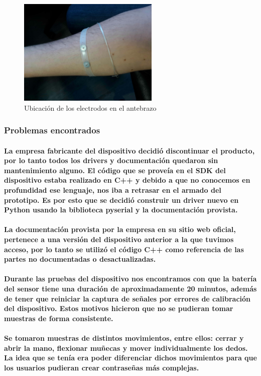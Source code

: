 \documentclass{article}
\begin{document}
\begin{figure}[ht]
    \centering
    \includegraphics[height=2in]{electrodo_antebrazo.png}%
    \caption{Ubicación de los electrodos en el antebrazo}
    \label{fig:electrodos2}
\end{figure}

\subsubsection{Problemas encontrados}
\paragraph{
La empresa fabricante del dispositivo decidió discontinuar el producto, por lo tanto todos los drivers y documentación quedaron sin mantenimiento alguno. El código que se proveía en el SDK del dispositivo estaba realizado en C++ y debido a que no conocemos en profundidad ese lenguaje, nos iba a retrasar en el armado del prototipo. Es por esto que se decidió construir un driver nuevo en Python usando la biblioteca pyserial y la documentación provista.
}
\paragraph{
La documentación provista por la empresa en su sitio web oficial, pertenece a una versión del dispositivo anterior a la que tuvimos acceso, por lo tanto se utilizó el código C++ como referencia de las partes no documentadas o desactualizadas.
}
\paragraph{
Durante las pruebas del dispositivo nos encontramos con que la batería del sensor tiene una duración de aproximadamente 20 minutos, además de tener que reiniciar la captura de señales por errores de calibración del dispositivo. Estos motivos hicieron que no se pudieran tomar muestras de forma consistente.
}
\paragraph{
Se tomaron muestras de distintos movimientos, entre ellos: cerrar y abrir la mano, flexionar muñecas y mover individualmente los dedos. La idea que se tenía era poder diferenciar dichos movimientos para que los usuarios pudieran crear contraseñas más complejas.
}
\end{document}
